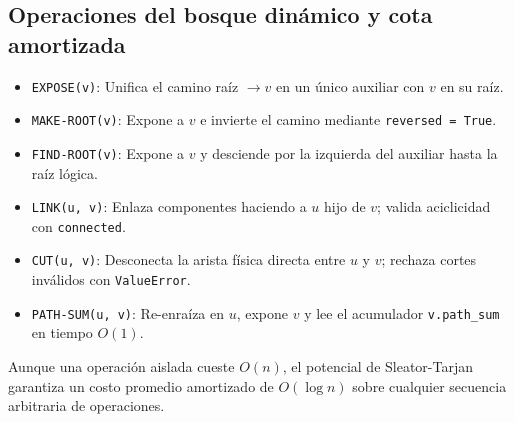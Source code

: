 \subsection{Operaciones del bosque dinámico y cota amortizada}
\begin{itemize}\setlength\itemsep{0pt}\setlength\parskip{0pt}
    \item \texttt{EXPOSE(v)}: Unifica el camino raíz $\to v$ en un único auxiliar con $v$ en su raíz.
    \item \texttt{MAKE-ROOT(v)}: Expone a $v$ e invierte el camino mediante \texttt{reversed = True}.
    \item \texttt{FIND-ROOT(v)}: Expone a $v$ y desciende por la izquierda del auxiliar hasta la raíz lógica.
    \item \texttt{LINK(u, v)}: Enlaza componentes haciendo a $u$ hijo de $v$; valida aciclicidad con \texttt{connected}.
    \item \texttt{CUT(u, v)}: Desconecta la arista física directa entre $u$ y $v$; rechaza cortes inválidos con \texttt{ValueError}.
    \item \texttt{PATH-SUM(u, v)}: Re-enraíza en $u$, expone $v$ y lee el acumulador \texttt{v.path\_sum} en tiempo $O(1)$.
\end{itemize}
Aunque una operación aislada cueste $O(n)$, el potencial de Sleator-Tarjan garantiza un costo promedio amortizado de $O(\log n)$ sobre cualquier secuencia arbitraria de operaciones.
